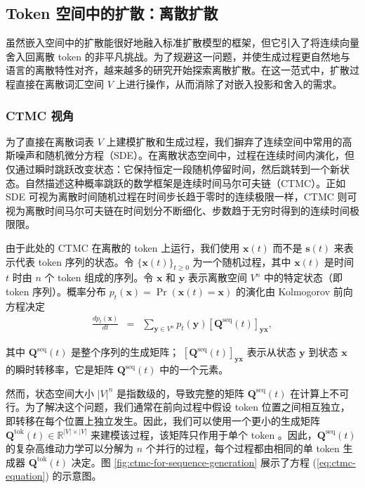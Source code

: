 \subsection{Token 空间中的扩散：离散扩散}

虽然嵌入空间中的扩散能很好地融入标准扩散模型的框架，但它引入了将连续向量舍入回离散 token 的非平凡挑战。为了规避这一问题，并使生成过程更自然地与语言的离散特性对齐，越来越多的研究开始探索离散扩散。在这一范式中，扩散过程直接在离散词汇空间 $V$ 上进行操作，从而消除了对嵌入投影和舍入的需求。
\subsubsection{CTMC 视角}
\label{sec:the-ctmc-perspective}

为了直接在离散词表 $V$ 上建模扩散和生成过程，我们摒弃了连续空间中常用的高斯噪声和随机微分方程（SDE）。在离散状态空间中，过程在连续时间内演化，但仅通过瞬时跳跃改变状态：它保持恒定一段随机停留时间，然后跳转到一个新状态。自然描述这种概率跳跃的数学框架是连续时间马尔可夫链（CTMC）。正如 SDE 可视为离散时间随机过程在时间步长趋于零时的连续极限一样，CTMC 则可视为离散时间马尔可夫链在时间划分不断细化、步数趋于无穷时得到的连续时间极限限。

由于此处的 CTMC 在离散的 token 上运行，我们使用 $\mathbf{x}(t)$ 而不是 $\mathbf{s}(t)$ 来表示代表 token 序列的状态。令 $\{\mathbf{x}(t)\}_{t \ge 0}$ 为一个随机过程，其中 $\mathbf{x}(t)$ 是时间 $t$ 时由 $n$ 个 token 组成的序列。令 $\mathbf{x}$ 和 $\mathbf{y}$ 表示离散空间 $V^n$ 中的特定状态（即 token 序列）。概率分布 $p_t(\mathbf{x}) = \Pr(\mathbf{x}(t)=\mathbf{x})$ 的演化由 Kolmogorov 前向方程决定
\begin{eqnarray}
\frac{d p_t(\mathbf{x})}{dt} & = & \sum_{\mathbf{y} \in V^n} p_t(\mathbf{y}) [\mathbf{Q}^{\mathrm{seq}}(t)]_{\mathbf{y}\mathbf{x}}, \label{eq:ctmc-equation}
\end{eqnarray}

\noindent 其中 $\mathbf{Q}^{\mathrm{seq}}(t)$ 是整个序列的生成矩阵； $[\mathbf{Q}^{\mathrm{seq}}(t)]_{\mathbf{y}\mathbf{x}}$ 表示从状态 $\mathbf{y}$ 到状态 $\mathbf{x}$ 的瞬时转移率，它是矩阵 $\mathbf{Q}^{\mathrm{seq}}(t)$ 中的一个元素。

然而，状态空间大小 $|V|^n$ 是指数级的，导致完整的矩阵 $\mathbf{Q}^{\mathrm{seq}}(t)$ 在计算上不可行。为了解决这个问题，我们通常在前向过程中假设 token 位置之间相互独立，即转移在每个位置上独立发生。因此，我们可以使用一个更小的生成矩阵 $\mathbf{Q}^{\mathrm{tok}}(t) \in \mathbb{R}^{|V| \times |V|}$ 来建模该过程，该矩阵只作用于单个 token 。因此，$\mathbf{Q}^{\mathrm{seq}}(t)$ 的复杂高维动力学可以分解为 $n$ 个并行的过程，每个过程都由相同的单 token 生成器 $\mathbf{Q}^{\mathrm{tok}}(t)$ 决定。图 \ref{fig:ctmc-for-sequence-generation} 展示了方程 (\ref{eq:ctmc-equation}) 的示意图。

